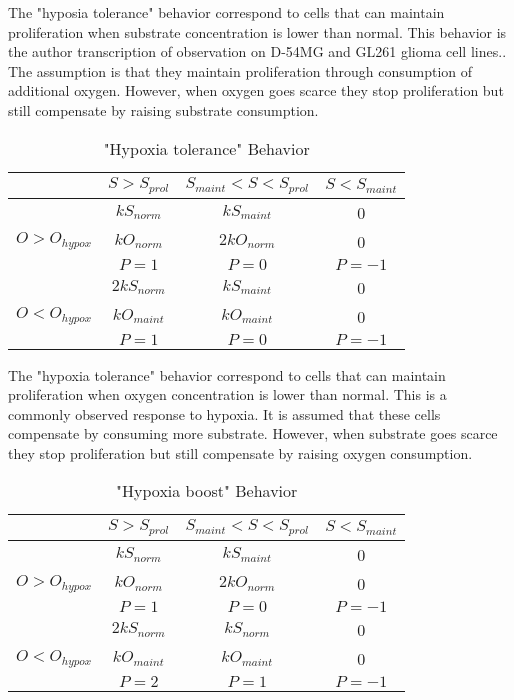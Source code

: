 \documentclass[11pt,a4paper]{article}
\begin{document}
The "hyposia tolerance" behavior correspond to cells that can maintain proliferation when substrate concentration is lower than normal. This behavior is the author transcription of observation on D-54MG and GL261 glioma cell lines.\cite{Griguer2005}. The assumption is that they maintain proliferation through consumption of additional oxygen. However, when oxygen goes scarce they stop proliferation but still compensate by raising substrate consumption.%

\begin{table}[h!]
\begin{center}
\begin{tabular}{ |c|c|c|c| }
\hline
 & \textbf{$S>S_{prol}$} & \textbf{$S_{maint}<S<S_{prol}$} & \textbf{$S<S_{maint}$} \\
\hline
 & $kS_{norm}$    &  $kS_{maint}$   & 0  \\
$O> O_{hypox}$ &  $kO_{norm}$   & $2kO_{norm}$ &  0 \\
 &  $P = 1$ & $P = 0$ & $P=-1$ \\
\hline
  & $2kS_{norm}$ & $kS_{maint}$ & 0 \\
$O< O_{hypox}$ & $kO_{maint}$ & $kO_{maint}$ & 0 \\
 & $P=1$  & $P=0$ & $P=-1$ \\
\hline
\end{tabular}
\caption{"Hypoxia tolerance" Behavior }
\end{center}
\end{table}

The "hypoxia tolerance" behavior correspond to cells that can maintain proliferation when oxygen concentration is lower than normal. This is a commonly observed response to hypoxia.\cite{Shen2020}\cite{Jozwiak2014} It is assumed that these cells compensate by consuming more substrate. However, when substrate goes scarce they stop proliferation but still compensate by raising oxygen consumption.  

\begin{table}[h!]
\begin{center}
\begin{tabular}{ |c|c|c|c| }
\hline
 & \textbf{$S>S_{prol}$} & \textbf{$S_{maint}<S<S_{prol}$} & \textbf{$S<S_{maint}$} \\
\hline
 & $kS_{norm}$    &  $kS_{maint}$   & 0  \\
$O> O_{hypox}$ &  $kO_{norm}$   & $2kO_{norm}$ &  0 \\
 &  $P = 1$ & $P = 0$ & $P=-1$ \\
\hline
  & $2kS_{norm}$ & $kS_{norm}$ & 0 \\
$O< O_{hypox}$ & $kO_{maint}$ & $kO_{maint}$ & 0 \\
 & $P=2$  & $P=1$ & $P=-1$ \\
\hline
\end{tabular}
\caption{"Hypoxia boost" Behavior }
\end{center}
\end{table}
\end{document}
